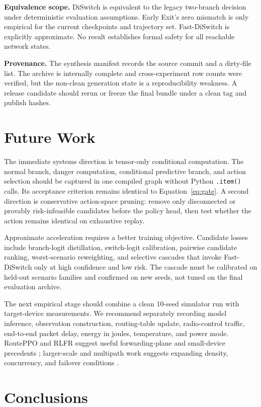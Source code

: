 \documentclass{ieeeaccess}
\newcommand{\DS}{DiSwitch}
\newcommand{\FastDS}{Fast-DiSwitch}
\begin{document}
\textbf{Equivalence scope.} \DS{} is equivalent to the legacy two-branch decision under deterministic evaluation assumptions. Early Exit's zero mismatch is only empirical for the current checkpoints and trajectory set. \FastDS{} is explicitly approximate. No result establishes formal safety for all reachable network states.

\textbf{Provenance.} The synthesis manifest records the source commit and a dirty-file list. The archive is internally complete and cross-experiment row counts were verified, but the non-clean generation state is a reproducibility weakness. A release candidate should rerun or freeze the final bundle under a clean tag and publish hashes.

\section{Future Work}

The immediate systems direction is tensor-only conditional computation. The normal branch, danger computation, conditional predictive branch, and action selection should be captured in one compiled graph without Python \texttt{.item()} calls. Its acceptance criterion remains identical to Equation~\eqref{eq:gate}. A second direction is conservative action-space pruning: remove only disconnected or provably risk-infeasible candidates before the policy head, then test whether the action remains identical on exhaustive replay.

Approximate acceleration requires a better training objective. Candidate losses include branch-logit distillation, switch-logit calibration, pairwise candidate ranking, worst-scenario reweighting, and selective cascades that invoke \FastDS{} only at high confidence and low risk. The cascade must be calibrated on held-out scenario families and confirmed on new seeds, not tuned on the final evaluation archive.

The next empirical stage should combine a clean 10-seed simulator run with target-device measurements. We recommend separately recording model inference, observation construction, routing-table update, radio-control traffic, end-to-end packet delay, energy in joules, temperature, and power mode. RoutePPO and RLFR suggest useful forwarding-plane and small-device precedents \cite{curmen2026routeppo,li2024rlfr}; larger-scale and multipath work suggests expanding density, concurrency, and failover conditions \cite{zhang2026large,zhao2026multipath}.

\section{Conclusions}
\end{document}
